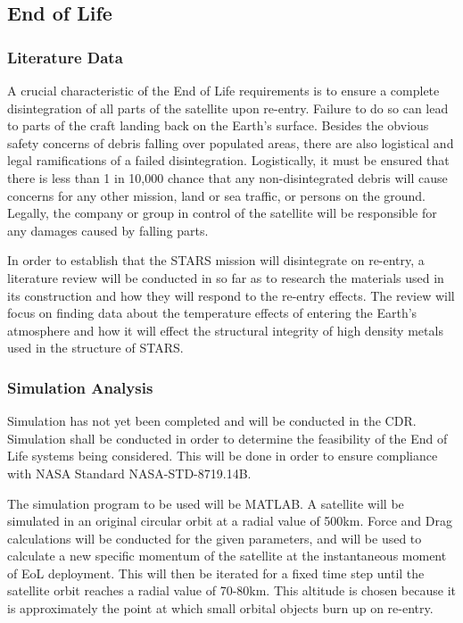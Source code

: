 \subsection{End of Life}
\subsubsection{Literature Data}
A crucial characteristic of the End of Life requirements is to ensure a complete disintegration of all parts of the satellite upon re-entry. Failure to do so can lead to parts of the craft landing back on the Earth's surface. Besides the obvious safety concerns of debris falling over populated areas, there are also logistical and legal ramifications of a failed disintegration. Logistically, it must be ensured that there is less than 1 in 10,000 chance that any non-disintegrated debris will cause concerns for any other mission, land or sea traffic, or persons on the ground. Legally, the company or group in control of the satellite will be responsible for any damages caused by falling parts. 

In order to establish that the STARS mission will disintegrate on re-entry, a literature review will be conducted in so far as to research the materials used in its construction and how they will respond to the re-entry effects. The review will focus on finding data about the temperature effects of entering the Earth's atmosphere and how it will effect the structural integrity of high density metals used in the structure of STARS. 

\subsubsection{Simulation Analysis}
Simulation has not yet been completed and will be conducted in the CDR.\\

Simulation shall be conducted in order to determine the feasibility of the End of Life systems being considered. This will be done in order to ensure compliance with NASA Standard NASA-STD-8719.14B. 

The simulation program to be used will be MATLAB. A satellite will be simulated in an original circular orbit at a radial value of 500km. Force and Drag calculations will be conducted for the given parameters, and will be used to calculate a new specific momentum of the satellite at the instantaneous moment of EoL deployment. This will then be iterated for a fixed time step until the satellite orbit reaches a radial value of 70-80km. This altitude is chosen because it is approximately the point at which small orbital objects burn up on re-entry. \cite{STD8719}

